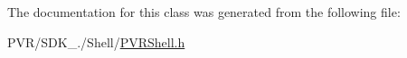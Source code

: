 


The documentation for this class was generated from the following file\+:\begin{DoxyCompactItemize}
\item 
P\+V\+R/\+S\+D\+K\+\_./\+Shell/\hyperlink{_p_v_r_shell_8h}{P\+V\+R\+Shell.\+h}\end{DoxyCompactItemize}

